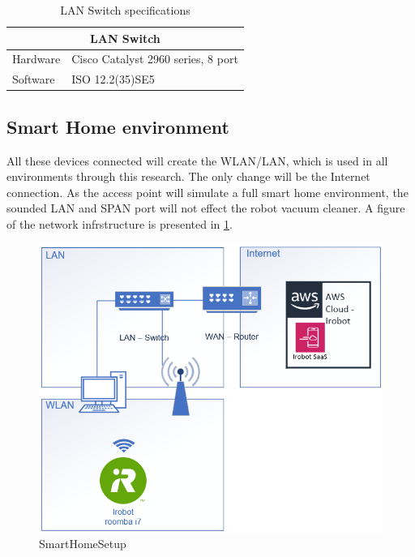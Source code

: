 \begin{table}[H]
\centering
\caption{LAN Switch specifications}
\label{tab:LanSwitchSpec}
\begin{tabular}{|ll|}
\hline
\multicolumn{2}{|c|}{\textbf{LAN Switch}}                           \\ \hline
\multicolumn{1}{|l|}{Hardware} & Cisco Catalyst 2960 series, 8 port \\ \hline
\multicolumn{1}{|l|}{Software} & ISO 12.2(35)SE5                    \\ \hline
\end{tabular}
\end{table}


\subsection{Smart Home environment}
All these devices connected will create the WLAN/LAN, which is used in all environments through this research. The only change will be the Internet connection. As the access point will simulate a full smart home environment, the sounded LAN and SPAN port will not effect the robot vacuum cleaner. A figure of the network infrstructure is presented in \ref{fig:SmartHomeSetup}. 

\begin{figure}[H]
    \centering
    \includegraphics[width=\textwidth]{figures/SmartHomeSetup.png}
    \caption{SmartHomeSetup}
    \label{fig:SmartHomeSetup}
\end{figure}



